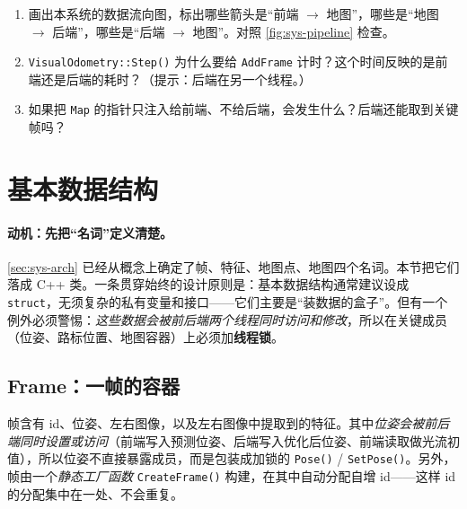 \begin{practice}[练习]
\begin{enumerate}
  \item 画出本系统的数据流向图，标出哪些箭头是“前端 $\to$ 地图”，哪些是“地图 $\to$ 后端”，哪些是“后端 $\to$ 地图”。对照 \cref{fig:sys-pipeline} 检查。
  \item \texttt{VisualOdometry::Step()} 为什么要给 \texttt{AddFrame} 计时？这个时间反映的是前端还是后端的耗时？（提示：后端在另一个线程。）
  \item 如果把 \texttt{Map} 的指针只注入给前端、不给后端，会发生什么？后端还能取到关键帧吗？
\end{enumerate}
\end{practice}

\section{基本数据结构}
\label{sec:sys-data}

\paragraph{动机：先把“名词”定义清楚。}
\cref{sec:sys-arch} 已经从概念上确定了帧、特征、地图点、地图四个名词。本节把它们落成 C++ 类。一条贯穿始终的设计原则是：基本数据结构通常建议设成 \texttt{struct}，无须复杂的私有变量和接口——它们主要是“装数据的盒子”。但有一个例外必须警惕：\emph{这些数据会被前后端两个线程同时访问和修改}，所以在关键成员（位姿、路标位置、地图容器）上必须加\textbf{线程锁}。

\subsection{Frame：一帧的容器}
\label{sec:sys-frame}

帧含有 id、位姿、左右图像，以及左右图像中提取到的特征。其中\emph{位姿会被前后端同时设置或访问}（前端写入预测位姿、后端写入优化后位姿、前端读取做光流初值），所以位姿不直接暴露成员，而是包装成加锁的 \texttt{Pose()} / \texttt{SetPose()}。另外，帧由一个\emph{静态工厂函数} \texttt{CreateFrame()} 构建，在其中自动分配自增 id——这样 id 的分配集中在一处、不会重复。

